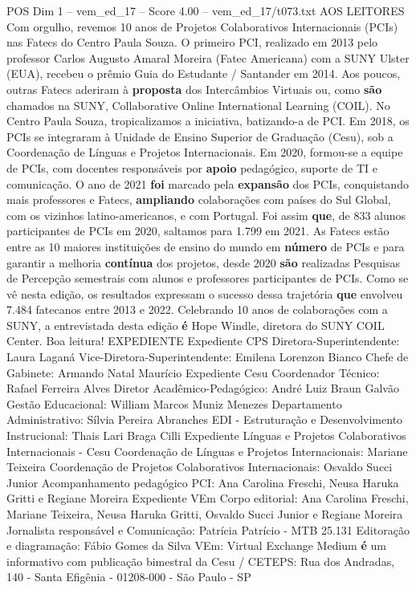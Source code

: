 \begin{textsample}{POS Dim 1 – vem\_ed\_17 – Score 4.00 – vem\_ed\_17/t073.txt}  \label{ex:f1_pos_137}
AOS LEITORES Com orgulho, revemos 10 anos de Projetos Colaborativos Internacionais (PCIs) nas Fatecs do Centro Paula Souza.
O primeiro PCI, realizado em 2013 pelo professor Carlos Augusto Amaral Moreira (Fatec Americana) com a SUNY Ulster (EUA), recebeu o prêmio Guia do Estudante / Santander em 2014.
Aos poucos, outras Fatecs aderiram à \textbf{proposta} dos Intercâmbios Virtuais ou, como \textbf{são} chamados na SUNY, Collaborative Online International Learning (COIL).
No Centro Paula Souza, tropicalizamos a iniciativa, batizando-a de PCI.
Em 2018, os PCIs se integraram à Unidade de Ensino Superior de Graduação (Cesu), sob a Coordenação de Línguas e Projetos Internacionais.
Em 2020, formou-se a equipe de PCIs, com docentes responsáveis por \textbf{apoio} pedagógico, suporte de TI e comunicação.
O ano de 2021 \textbf{foi} marcado pela \textbf{expansão} dos PCIs, conquistando mais professores e Fatecs, \textbf{ampliando} colaborações com países do Sul Global, com os vizinhos latino-americanos, e com Portugal.
Foi assim \textbf{que}, de 833 alunos participantes de PCIs em 2020, saltamos para 1.799 em 2021.
As Fatecs estão entre as 10 maiores instituições de ensino do mundo em \textbf{número} de PCIs e para garantir a melhoria \textbf{contínua} dos projetos, desde 2020 \textbf{são} realizadas Pesquisas de Percepção semestrais com alunos e professores participantes de PCIs.
Como se vê nesta edição, os resultados expressam o sucesso dessa trajetória \textbf{que} envolveu 7.484 fatecanos entre 2013 e 2022.
Celebrando 10 anos de colaborações com a SUNY, a entrevistada desta edição \textbf{é} Hope Windle, diretora do SUNY COIL Center.
Boa leitura!
EXPEDIENTE Expediente CPS Diretora-Superintendente: Laura Laganá Vice-Diretora-Superintendente: Emilena Lorenzon Bianco Chefe de Gabinete: Armando Natal Maurício Expediente Cesu Coordenador Técnico: Rafael Ferreira Alves Diretor Acadêmico-Pedagógico: André Luiz Braun Galvão Gestão Educacional: William Marcos Muniz Menezes Departamento Administrativo: Sílvia Pereira Abranches EDI - Estruturação e Desenvolvimento Instrucional: Thais Lari Braga Cilli Expediente Línguas e Projetos Colaborativos Internacionais - Cesu Coordenação de Línguas e Projetos Internacionais: Mariane Teixeira Coordenação de Projetos Colaborativos Internacionais: Osvaldo Succi Junior Acompanhamento pedagógico PCI: Ana Carolina Freschi, Neusa Haruka Gritti e Regiane Moreira Expediente VEm Corpo editorial: Ana Carolina Freschi, Mariane Teixeira, Neusa Haruka Gritti, Osvaldo Succi Junior e Regiane Moreira Jornalista responsável e Comunicação: Patrícia Patrício - MTB 25.131 Editoração e diagramação: Fábio Gomes da Silva VEm: Virtual Exchange Medium \textbf{é} um informativo com publicação bimestral da Cesu / CETEPS: Rua dos Andradas, 140 - Santa Efigênia - 01208-000 - São Paulo - SP

\end{textsample}
